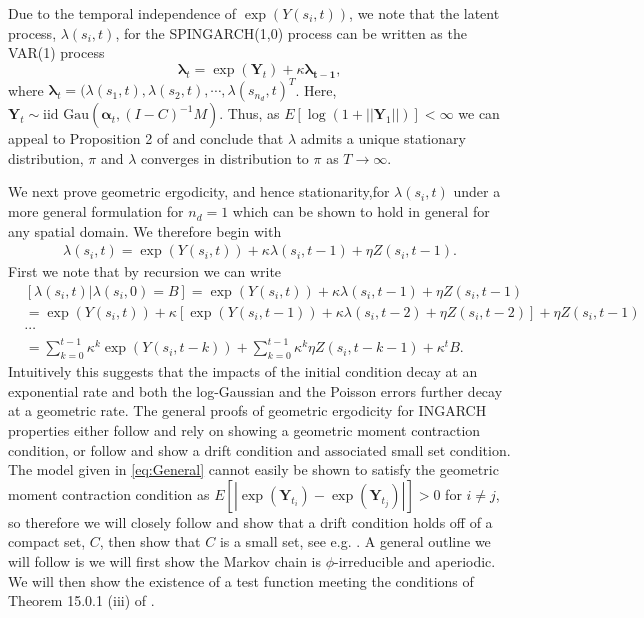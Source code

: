 \documentclass[11pt]{isuthesis}
\begin{document}
Due to the temporal independence of $\exp(Y(s_i,t))$, we note that the latent process, $\lambda(s_i,t)$, for the SPINGARCH(1,0) process can be written as the VAR(1) process
\begin{equation}
	\boldsymbol{\lambda}_t=\exp(\boldsymbol{Y}_t)+\kappa\boldsymbol{\lambda_{t-1}},
\end{equation}
where $\boldsymbol{\lambda}_{t} = (\lambda(s_1,t),\lambda(s_2,t),\cdots,\lambda(s_{n_d},t)^T$.  Here, $\boldsymbol{Y}_t \sim \mbox{iid Gau}\left(\boldsymbol{\alpha}_t,(I-C)^{-1}M\right)$.  Thus, as $E[\log \left(1+||\boldsymbol{Y}_1||\right)]<\infty$ we can appeal to Proposition 2 of \cite{zeevi2004recurrence} and conclude that $\lambda$ admits a unique stationary distribution, $\pi$ and $\lambda$ converges in distribution to $\pi$ as $T\to \infty$.

We next prove geometric ergodicity, and hence stationarity,for $\lambda(s_i,t)$ under a more general formulation for $n_d=1$ which can be shown to hold in general for any spatial domain.  We therefore begin with
\begin{align}
	\lambda(s_i,t)= \exp(Y(s_i,t))+\kappa \lambda(s_i,t-1) + \eta Z(s_i,t-1) \label{eq:General}.
\end{align}
First we note that by recursion we can write
\begin{align*}
	& [\lambda(s_i,t)|\lambda(s_i,0)=B] = \exp(Y(s_i,t))+\kappa \lambda(s_i,t-1) + \eta Z(s_i,t-1)\\
	& = \exp(Y(s_i,t))+\kappa \left[\exp(Y(s_i,t-1))+\kappa \lambda(s_i,t-2) + \eta Z(s_i,t-2)\right] + \eta Z(s_i,t-1)\\
	&\cdots\\
	& =\sum_{k=0}^{t-1} \kappa^k\exp(Y(s_i,t-k)) +\sum_{k=0}^{t-1} \kappa^k\eta Z(s_i,t-k-1)+\kappa^t B. \label{eq:Recursion}
\end{align*}
Intuitively this suggests that the impacts of the initial condition decay at an exponential rate and both the log-Gaussian and the Poisson errors further decay at a geometric rate.  The general proofs of geometric ergodicity for INGARCH properties either follow \cite{davis2016theory} and rely on showing a geometric moment contraction condition, or follow \cite{fokianos2009poisson} and show a drift condition and associated small set condition.  The model given in \eqref{eq:General} cannot easily be shown to satisfy the geometric moment contraction condition as $E[|\exp(\boldsymbol{Y}_{t_i})-\exp(\boldsymbol{Y}_{t_j})|]>0$ for $i \neq j$, so therefore we will closely follow \cite{fokianos2009poisson} and show that a drift condition holds off of a compact set, $C$, then show that $C$ is a small set, see e.g. \cite{meyn2012markov}.  A general outline we will follow is we will first show the Markov chain is $\phi$-irreducible and aperiodic.  We will then show the existence of a test function meeting the conditions of Theorem 15.0.1 (iii) of \cite{meyn2012markov}.
\end{document}
